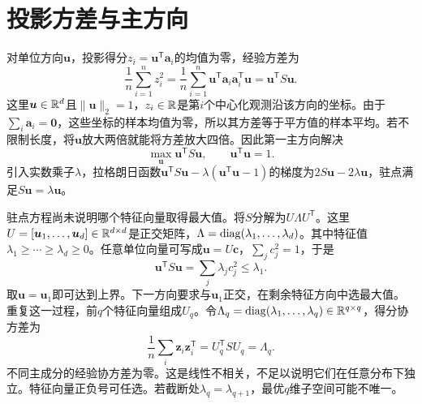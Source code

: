 \section{投影方差与主方向}
对单位方向$\bm u$，投影得分$z_i=\bm u^{\mathsf T}\bm a_i$的均值为零，经验方差为
\begin{equation}
 \frac1n\sum_{i=1}^n z_i^2
 =\frac1n\sum_{i=1}^n\bm u^{\mathsf T}\bm a_i\bm a_i^{\mathsf T}\bm u
 =\bm u^{\mathsf T}S\bm u.
\end{equation}
这里$\bm u\in\mathbb{R}^d$且$\|\bm u\|_2=1$，$z_i\in\mathbb{R}$是第$i$个中心化观测沿该方向的坐标。由于$\sum_i\bm a_i=\bm0$，这些坐标的样本均值为零，所以其方差等于平方值的样本平均。若不限制长度，将$\bm u$放大两倍就能将方差放大四倍。因此第一主方向解决
\begin{equation}
 \max_{\bm u}\bm u^{\mathsf T}S\bm u,
 \qquad\bm u^{\mathsf T}\bm u=1.
 \label{eq:pca-rayleigh}
\end{equation}
引入实数乘子$\lambda$，拉格朗日函数$\bm u^{\mathsf T}S\bm u-\lambda(\bm u^{\mathsf T}\bm u-1)$的梯度为$2S\bm u-2\lambda\bm u$，驻点满足$S\bm u=\lambda\bm u$。

驻点方程尚未说明哪个特征向量取得最大值。将$S$分解为$U\Lambda U^{\mathsf T}$。这里$U=[\bm u_1,\ldots,\bm u_d]\in\mathbb{R}^{d\times d}$是正交矩阵，$\Lambda=\operatorname{diag}(\lambda_1,\ldots,\lambda_d)$。其中特征值$\lambda_1\ge\cdots\ge\lambda_d\ge0$。任意单位向量可写成$\bm u=U\bm c$，$\sum_jc_j^2=1$，于是
\begin{equation}
 \bm u^{\mathsf T}S\bm u=\sum_j\lambda_jc_j^2\le\lambda_1.
\end{equation}
取$\bm u=\bm u_1$即可达到上界。下一方向要求与$\bm u_1$正交，在剩余特征方向中选最大值。重复这一过程，前$q$个特征向量组成$U_q$。令$\Lambda_q=\operatorname{diag}(\lambda_1,\ldots,\lambda_q)\in\mathbb{R}^{q\times q}$，得分协方差为
\begin{equation}
 \frac1n\sum_i\bm z_i\bm z_i^{\mathsf T}=U_q^{\mathsf T}SU_q=\Lambda_q.
\end{equation}
不同主成分的经验协方差为零。这是线性不相关，不足以说明它们在任意分布下独立。特征向量正负号可任选。若截断处$\lambda_q=\lambda_{q+1}$，最优$q$维子空间可能不唯一。

